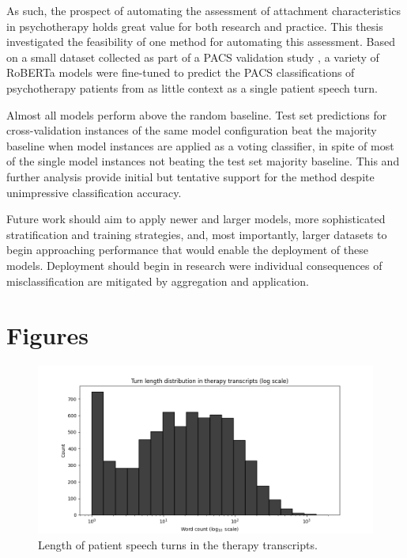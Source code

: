 \documentclass[12pt]{report}
\begin{document}
As such, the prospect of automating the assessment of attachment characteristics in psychotherapy holds great value for both research and practice.
This thesis investigated the feasibility of one method for automating this assessment.
Based on a small dataset collected as part of a PACS validation study \cite{Talia2017}, a variety of RoBERTa models \cite{roberta} were fine-tuned to predict the PACS classifications of psychotherapy patients from as little context as a single patient speech turn.

Almost all models perform above the random baseline.
Test set predictions for cross-validation instances of the same model configuration beat the majority baseline when model instances are applied as a voting classifier, in spite of most of the single model instances not beating the test set majority baseline.
This and further analysis provide initial but tentative support for the method despite unimpressive classification accuracy.

Future work should aim to apply newer and larger models, more sophisticated stratification and training strategies, and, most importantly, larger datasets to begin approaching performance that would enable the deployment of these models.
Deployment should begin in research were individual consequences of misclassification are mitigated by aggregation and application.



\appendix
\chapter{Figures}
\label{App: Figures}

\begin{figure}
    \includegraphics[width=\textwidth]{figures/log_turn_length_dist_full.png}
    \caption{Length of patient speech turns in the therapy transcripts.}
    \label{fig: PACS turn length}
\end{figure}
\end{document}
